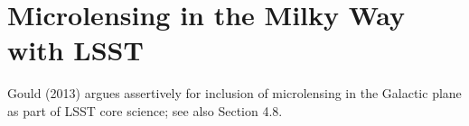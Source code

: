 %
%
%
%
%
%
%

\section{Microlensing in the Milky Way with LSST}
\def\secname{MW_microlensing}\label{sec:\secname} %





Gould (2013) argues assertively for inclusion of microlensing in the
Galactic plane as part of LSST core science; see also Section 4.8.




